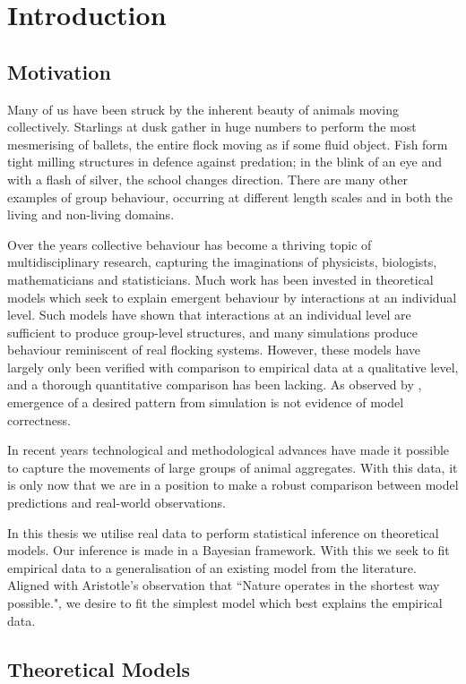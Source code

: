 \chapter{Introduction}
\label{cha:introduction}

\section{Motivation}
Many of us have been struck by the inherent beauty of animals moving collectively. Starlings at dusk gather in huge numbers to perform the most mesmerising of ballets, the entire flock moving as if some fluid object. Fish form tight milling structures in defence against predation; in the blink of an eye and with a flash of silver, the school changes direction. There are many other examples of group behaviour, occurring at different length scales and in both the living and non-living domains.

Over the years collective behaviour has become a thriving topic of multidisciplinary research, capturing the imaginations of physicists, biologists, mathematicians and statisticians. Much work has been invested in theoretical models which seek to explain emergent behaviour by interactions at an individual level. Such models have shown that interactions at an individual level are sufficient to produce group-level structures, and many simulations produce behaviour reminiscent of real flocking systems. However, these models have largely only been verified with comparison to empirical data at a qualitative level, and a thorough quantitative comparison has been lacking. As observed by \citet{li08}, emergence of a desired pattern from simulation is not evidence of model correctness.

In recent years technological and methodological advances have made it possible to capture the movements of large groups of animal aggregates. With this data, it is only now that we are in a position to make a robust comparison between model predictions and real-world observations.

In this thesis we utilise real data to perform statistical inference on theoretical models. Our inference is made in a Bayesian framework. With this we seek to fit empirical data to a generalisation of an existing model from the literature. Aligned with Aristotle's observation that ``Nature operates in the shortest way possible.", we desire to fit the simplest model which best explains the empirical data.

\section{Theoretical Models}
\label{sec:models}
